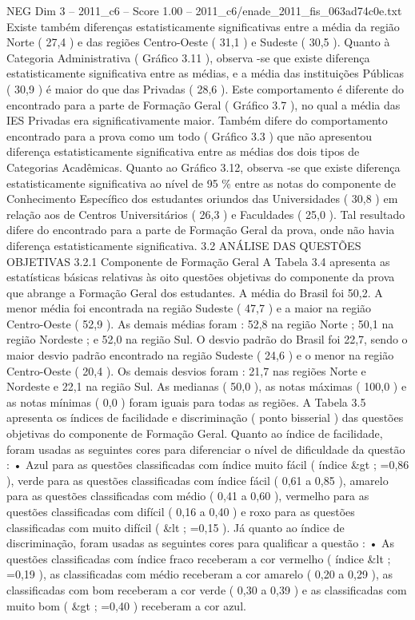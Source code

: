\begin{textsample}{NEG Dim 3 – 2011\_c6 – Score 1.00 – 2011\_c6/enade\_2011\_fis\_063ad74c0e.txt}
Existe também diferenças estatisticamente significativas entre a média da região Norte ( 27,4 ) e das regiões Centro-Oeste ( 31,1 ) e Sudeste ( 30,5 ).
Quanto à Categoria Administrativa ( Gráfico 3.11 ), observa -se que existe diferença estatisticamente significativa entre as médias, e a média das instituições Públicas ( 30,9 ) é maior do que das Privadas ( 28,6 ).
Este comportamento é diferente do encontrado para a parte de Formação Geral ( Gráfico 3.7 ), no qual a média das IES Privadas era significativamente maior.
Também difere do comportamento encontrado para a prova como um todo ( Gráfico 3.3 ) que não apresentou diferença estatisticamente significativa entre as médias dos dois tipos de Categorias Acadêmicas.
Quanto ao Gráfico 3.12, observa -se que existe diferença estatisticamente significativa ao nível de 95 \% entre as notas do componente de Conhecimento Específico dos estudantes oriundos das Universidades ( 30,8 ) em relação aos de Centros Universitários ( 26,3 ) e Faculdades ( 25,0 ).
Tal resultado difere do encontrado para a parte de Formação Geral da prova, onde não havia diferença estatisticamente significativa. 3.2 ANÁLISE DAS QUESTÕES OBJETIVAS 3.2.1 Componente de Formação Geral A Tabela 3.4 apresenta as estatísticas básicas relativas às oito questões objetivas do componente da prova que abrange a Formação Geral dos estudantes.
A média do Brasil foi 50,2.
A menor média foi encontrada na região Sudeste ( 47,7 ) e a maior na região Centro-Oeste ( 52,9 ).
As demais médias foram : 52,8 na região Norte ; 50,1 na região Nordeste ; e 52,0 na região Sul.
O desvio padrão do Brasil foi 22,7, sendo o maior desvio padrão encontrado na região Sudeste ( 24,6 ) e o menor na região Centro-Oeste ( 20,4 ).
Os demais desvios foram : 21,7 nas regiões Norte e Nordeste e 22,1 na região Sul.
As medianas ( 50,0 ), as notas máximas ( 100,0 ) e as notas mínimas ( 0,0 ) foram iguais para todas as regiões.
A Tabela 3.5 apresenta os índices de facilidade e discriminação ( ponto bisserial ) das questões objetivas do componente de Formação Geral.
Quanto ao índice de facilidade, foram usadas as seguintes cores para diferenciar o nível de dificuldade da questão : • Azul para as questões classificadas com índice muito fácil ( índice \&gt ; =0,86 ), verde para as questões classificadas com índice fácil ( 0,61 a 0,85 ), amarelo para as questões classificadas com médio ( 0,41 a 0,60 ), vermelho para as questões classificadas com difícil ( 0,16 a 0,40 ) e roxo para as questões classificadas com muito difícil ( \&lt ; =0,15 ).
Já quanto ao índice de discriminação, foram usadas as seguintes cores para qualificar a questão : • As questões classificadas com índice fraco receberam a cor vermelho ( índice \&lt ; =0,19 ), as classificadas com médio receberam a cor amarelo ( 0,20 a 0,29 ), as classificadas com bom receberam a cor verde ( 0,30 a 0,39 ) e as classificadas com muito bom ( \&gt ; =0,40 ) receberam a cor azul.

\end{textsample}
